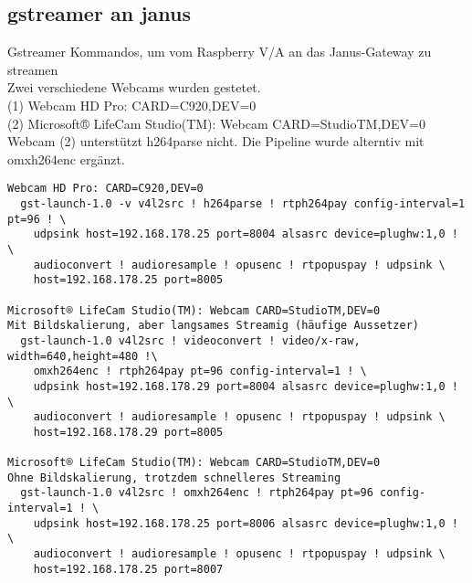 \subsection{gstreamer an janus} \label{RefGstrToJanus}
Gstreamer Kommandos, um vom Raspberry V/A an das Janus-Gateway zu streamen\\
Zwei verschiedene Webcams wurden gestetet. \\
(1) Webcam HD Pro: CARD=C920,DEV=0 \\
(2) Microsoft® LifeCam Studio(TM): Webcam CARD=StudioTM,DEV=0 \\
Webcam (2) unterstützt h264parse nicht. Die Pipeline wurde alterntiv mit 
omxh264enc ergänzt. 
\begin{verbatim}
Webcam HD Pro: CARD=C920,DEV=0
  gst-launch-1.0 -v v4l2src ! h264parse ! rtph264pay config-interval=1 pt=96 ! \
    udpsink host=192.168.178.25 port=8004 alsasrc device=plughw:1,0 ! \ 
    audioconvert ! audioresample ! opusenc ! rtpopuspay ! udpsink \ 
    host=192.168.178.25 port=8005
 
Microsoft® LifeCam Studio(TM): Webcam CARD=StudioTM,DEV=0
Mit Bildskalierung, aber langsames Streamig (häufige Aussetzer)
  gst-launch-1.0 v4l2src ! videoconvert ! video/x-raw, width=640,height=480 !\
    omxh264enc ! rtph264pay pt=96 config-interval=1 ! \ 
    udpsink host=192.168.178.29 port=8004 alsasrc device=plughw:1,0 ! \
    audioconvert ! audioresample ! opusenc ! rtpopuspay ! udpsink \
    host=192.168.178.29 port=8005 
   
Microsoft® LifeCam Studio(TM): Webcam CARD=StudioTM,DEV=0
Ohne Bildskalierung, trotzdem schnelleres Streaming
  gst-launch-1.0 v4l2src ! omxh264enc ! rtph264pay pt=96 config-interval=1 ! \ 
    udpsink host=192.168.178.25 port=8006 alsasrc device=plughw:1,0 ! \
    audioconvert ! audioresample ! opusenc ! rtpopuspay ! udpsink \
    host=192.168.178.25 port=8007 
\end{verbatim}

